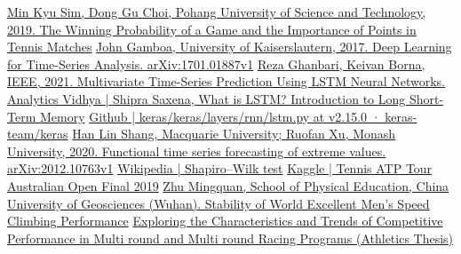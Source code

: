\documentclass[12pt]{article}  %
\begin{document}
\begin{thebibliography}{99}
	 \href{https://www.tandfonline.com/doi/full/10.1080/02701367.2019.1666203}{Min Kyu Sim, Dong Gu Choi, Pohang University of Science and Technology, 2019. The Winning Probability of a Game and the Importance of Points in Tennis Matches}
	 \href{https://arxiv.org/pdf/1701.01887.pdf}{John Gamboa, University of Kaiserslautern, 2017. Deep Learning for Time-Series Analysis. arXiv:1701.01887v1}
	 \href{https://ieeexplore.ieee.org/document/9420543}{Reza Ghanbari, Keivan Borna, IEEE, 2021. Multivariate Time-Series Prediction Using LSTM Neural Networks.}
	 \href{https://www.analyticsvidhya.com/blog/2021/03/introduction-to-long-short-term-memory-lstm/}{Analytics Vidhya | Shipra Saxena, What is LSTM? Introduction to Long Short-Term Memory}
	 \href{https://github.com/keras-team/keras/blob/v2.15.0/keras/layers/rnn/lstm.py#L382-L891}{Github | keras/keras/layers/rnn/lstm.py at v2.15.0 · keras-team/keras}
	 \href{https://arxiv.org/pdf/2012.10763.pdf}{Han Lin Shang, Macquarie University; Ruofan Xu, Monash University, 2020. Functional time series forecasting of extreme values. arXiv:2012.10763v1}
	 \href{https://en.wikipedia.org/wiki/Shapiro%E2%80%93Wilk_test}{Wikipedia | Shapiro–Wilk test}
	 \href{https://www.kaggle.com/datasets/robseidl/tennis-atp-tour-australian-open-final-2019}{Kaggle | Tennis ATP Tour Australian Open Final 2019}
	 \href{https://kns.cnki.net/kcms2/article/abstract?v=-0THPtffOh0bQVlHVveBVTVKK1xaOhfEEwEGfcv0Ri8tdLgkqDPfzYfnNHJrYp-q0S8EWmzQPrPqy3KWqVWK-Gz-sHas1SAdT6n64JOD8XYzscwWreE7MjTzFXMPUTkQchdeqW0j10DPxHxNslquvERQIZ21ZAXiAn9DCD-5hTg=&uniplatform=NZKPT&language=CHS}{Zhu Mingquan, School of Physical Education, China University of Geosciences (Wuhan). Stability of World Excellent Men's Speed Climbing Performance}
	 \href{http://www.woc88.com/d-115024857.html}{Exploring the Characteristics and Trends of Competitive Performance in Multi round and Multi round Racing Programs (Athletics Thesis)}

\end{thebibliography}

\end{document}
